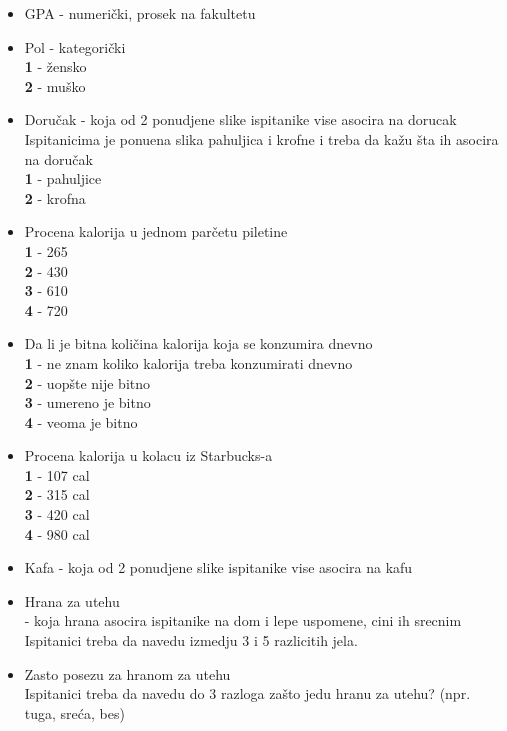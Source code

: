 \documentclass[12pt,a4paper]{article}
\begin{document}
\begin{itemize}
  \item GPA - numeri\v cki, prosek na fakultetu\\
  \item Pol - kategori\v cki\\
    \textbf{1} - \v zensko\\
    \textbf{2} - mu\v sko
  \item Doru\v cak - koja od 2 ponudjene slike ispitanike vise asocira na dorucak\\
    Ispitanicima je ponu\dj ena slika pahuljica i krofne i treba da ka\v zu \v sta ih asocira na doru\v cak\\
    \textbf{1} - pahuljice\\
    \textbf{2} - krofna 
  \item Procena kalorija u jednom par\v cetu piletine\\
    \textbf{1} - 265\\ 
    \textbf{2} - 430\\
    \textbf{3} - 610\\
    \textbf{4} - 720
  \item Da li je bitna koli\v cina kalorija koja se konzumira dnevno\\
    \textbf{1} - ne znam koliko kalorija treba konzumirati dnevno\\
    \textbf{2} - uop\v ste nije bitno\\
    \textbf{3} - umereno je bitno\\
    \textbf{4} - veoma je bitno
  \item Procena kalorija u kolacu iz Starbucks-a\\
    \textbf{1} - 107 cal\\ 
    \textbf{2} - 315 cal\\ 
    \textbf{3} - 420 cal\\ 
    \textbf{4} - 980 cal
  \item Kafa - koja od 2 ponudjene slike ispitanike vise asocira na kafu\\
  \item Hrana za utehu\\ - koja hrana asocira ispitanike na dom i lepe uspomene, cini ih srecnim
    Ispitanici treba da navedu izmedju 3 i 5 razlicitih jela.\\
  \item Zasto posezu za hranom za utehu \\
    Ispitanici treba da navedu do 3 razloga za\v sto jedu hranu za utehu? (npr. tuga, sre\' ca, bes)\\

\end{itemize}
\end{document}
